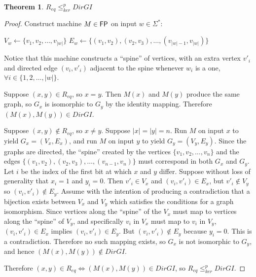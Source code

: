 \documentclass{article}
\newtheorem{theorem}{Theorem}%
\theoremstyle{definition}
\newcommand{\sigmastar}{\Sigma^{*}}
\newcommand{\kr}{\leq^{p}_{ker}} %
\begin{document}
\begin{theorem}\label{thm:req_kr_dirgi}$R_{eq} \kr DirGI$\end{theorem}
\begin{proof}
  Construct machine $M\in{\ensuremath{\mathsf{FP}}}$ on input $w\in\sigmastar$:\\
  \begin{algorithm}[H]
    $V_w\gets\{v_1, v_2, \ldots, v_{|w|}\}$\; 
    $E_w\gets\{(v_1, v_2), (v_2, v_3), \ldots, (v_{|w|-1},
    v_{|w|})\}$\;
  \end{algorithm}
  Notice that this machine constructs a ``spine'' of vertices, with an extra
  vertex $v'_i$ and directed edge $(v_i, v'_i)$ adjacent to the spine whenever
  $w_i$ is a one, $\forall i\in\{1,2,\ldots,|w|\}$.

  Suppose $(x, y)\in R_{eq}$, so $x=y$. Then $M(x)$ and $M(y)$ produce the same
  graph, so $G_x$ is isomorphic to $G_y$ by the identity mapping. Therefore
  $(M(x), M(y))\in DirGI$.
  
  Suppose $(x, y)\notin R_{eq}$, so $x\neq y$. Suppose $|x|=|y|=n$. Run $M$ on
  input $x$ to yield $G_x=(V_x, E_x)$, and run $M$ on input $y$ to yield
  $G_y=(V_y, E_y)$. Since the graphs are directed, the ``spine'' created by the
  vertices $\{v_1, v_2, \ldots, v_n\}$ and the edges $\{(v_1, v_2), (v_2, v_3),
  \ldots, (v_{n-1}, v_n)\}$ must correspond in both $G_x$ and $G_y$. Let $i$ be
  the index of the first bit at which $x$ and $y$ differ. Suppose without loss
  of generality that $x_i=1$ and $y_i=0$. Then $v'_i\in V_x$ and $(v_i,
  v'_i)\in E_x$, but $v'_i\notin V_y$ so $(v_i, v'_i)\notin E_y$. Assume with
  the intention of producing a contradiction that a bijection exists between
  $V_x$ and $V_y$ which satisfies the conditions for a graph isomorphism. Since
  vertices along the ``spine'' of the $V_x$ must map to vertices along the
  ``spine'' of $V_y$, and specifically $v_i$ in $V_x$ must map to $v_i$ in
  $V_y$, $(v_i, v'_i)\in E_x$ implies $(v_i, v'_i)\in E_y$. But $(v_i,
  v'_i)\notin E_y$ because $y_i=0$. This is a contradiction. Therefore no such
  mapping exists, so $G_x$ is not isomorphic to $G_y$, and hence $(M(x),
  M(y))\notin DirGI$.

  Therefore $(x, y)\in R_{eq} \iff (M(x), M(y))\in DirGI$, so $R_{eq}\kr
  DirGI$.
\end{proof}
\end{document}
